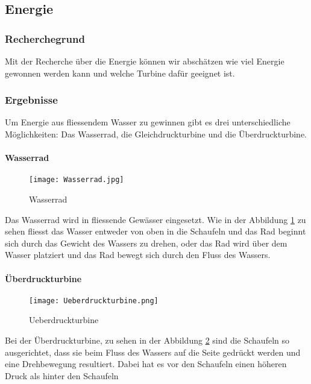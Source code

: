 \subsection{Energie}

\subsubsection{Recherchegrund}

Mit der Recherche über die Energie können wir abschätzen wie viel Energie gewonnen werden kann und welche Turbine dafür geeignet ist.

\subsubsection{Ergebnisse}

Um Energie aus fliessendem Wasser zu gewinnen gibt es drei unterschiedliche Möglichkeiten: Das Wasserrad, die Gleichdruckturbine und die Überdruckturbine. 

\paragraph{Wasserrad}
\begin{figure}[H]
	\centering
	\texttt{[image: Wasserrad.jpg]}
	\caption{Wasserrad \cite{wisse}} 
	\label{fig:Wasserrad}
\end{figure}

Das Wasserrad wird in fliessende Gewässer eingesetzt. Wie in der Abbildung \ref{fig:Wasserrad}  zu sehen fliesst das Wasser entweder von oben in die Schaufeln und das Rad beginnt sich durch das Gewicht des Wassers zu drehen, oder das Rad wird über dem Wasser platziert und das Rad bewegt sich durch den Fluss des Wassers.

\newpage

\paragraph{Überdruckturbine}
\begin{figure} [H]
	\centering
	\texttt{[image: Ueberdruckturbine.png]}
	\caption{Ueberdruckturbine \cite{wiki_ueberdruck}}
	\label{fig:Ueberdruckturbine}
\end{figure}

Bei der Überdruckturbine, zu sehen in der Abbildung \ref{fig:Ueberdruckturbine}  sind die Schaufeln so ausgerichtet, dass sie beim Fluss des Wassers auf die Seite gedrückt werden und eine Drehbewegung resultiert. Dabei hat es vor den Schaufeln einen höheren Druck als hinter den Schaufeln

